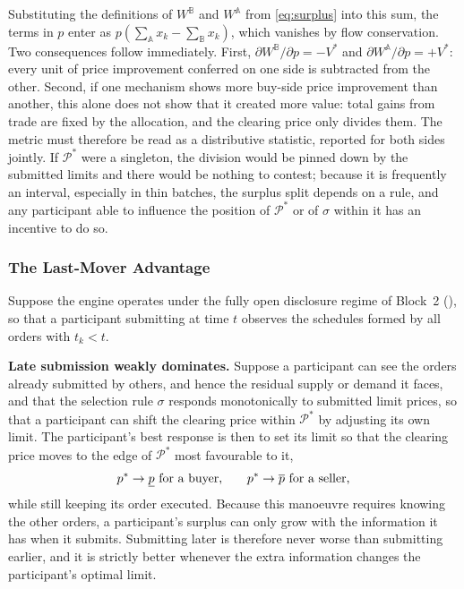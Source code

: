 Substituting the definitions of $W^{\mathbb{B}}$ and $W^{\mathbb{A}}$ from
\eqref{eq:surplus} into this sum, the terms in $p$ enter as
$p\left(\sum_{\mathbb{A}} x_k - \sum_{\mathbb{B}} x_k\right)$, which
vanishes by flow conservation. Two consequences follow immediately.
First, $\partial W^{\mathbb{B}} / \partial p = -V^{*}$ and
$\partial W^{\mathbb{A}} / \partial p = +V^{*}$: every unit of
price improvement conferred on one side is subtracted from the other.
Second, if one mechanism shows more buy-side price improvement than
another, this alone does not show that it created more value: total gains from trade are fixed by the
allocation, and the clearing price only divides them. The metric must
therefore be read as a distributive statistic, reported for both sides
jointly. If $\mathcal{P}^{*}$ were a singleton, the division would be
pinned down by the submitted limits and there would be nothing to
contest; because it is frequently an interval, especially in thin
batches, the surplus split depends on a rule, and any participant able to
influence the position of $\mathcal{P}^{*}$ or of $\sigma$ within it has an
incentive to do so.

\subsubsection{The Last-Mover Advantage}

Suppose the engine operates under the fully open disclosure regime of
Block~2 (), so that a participant submitting at time
$t$ observes the schedules formed by all orders with $t_k < t$.

\textbf{Late submission weakly dominates.} Suppose a participant can see
the orders already submitted by others, and hence the residual supply or
demand it faces, and that the selection rule $\sigma$ responds
monotonically to submitted limit prices, so that a participant can shift
the clearing price within $\mathcal{P}^{*}$ by adjusting its own limit.
The participant's best response is then to set its limit so that the
clearing price moves to the edge of $\mathcal{P}^{*}$ most favourable to it,
\begin{equation}
\label{prop:lastmover}
  p^{\ast} \to \underline{p} \text{ for a buyer,} \qquad
  p^{\ast} \to \overline{p} \text{ for a seller,}
\end{equation}
while still keeping its order executed. Because this manoeuvre requires
knowing the other orders, a participant's surplus can only grow with the
information it has when it submits. Submitting later is therefore never
worse than submitting earlier, and it is strictly better whenever the
extra information changes the participant's optimal limit.

